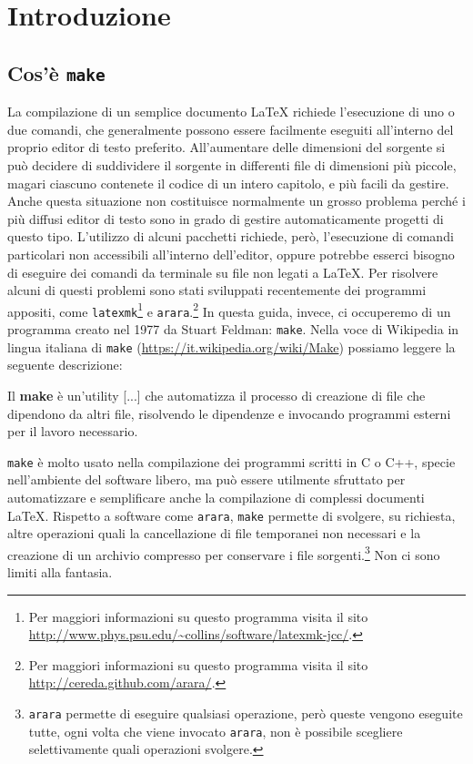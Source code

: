 \section{Introduzione}
\label{sec:introduzione}

\subsection{Cos'è \texttt{make}}
\label{sec:cose-make}

La compilazione di un semplice documento \LaTeX{}
richiede l'esecuzione di uno o due comandi, che generalmente possono essere
facilmente eseguiti all'interno del proprio editor di testo preferito.
All'aumentare delle dimensioni del sorgente si può decidere di suddividere il
sorgente in differenti file di dimensioni più piccole, magari ciascuno contenete
il codice di un intero capitolo, e più facili da gestire.  Anche questa
situazione non costituisce normalmente un grosso problema perché i più diffusi
editor di testo sono in grado di gestire automaticamente progetti di questo
tipo.  L'utilizzo di alcuni pacchetti richiede, però, l'esecuzione di comandi
particolari non accessibili all'interno dell'editor, oppure potrebbe esserci
bisogno di eseguire dei comandi da terminale su file non legati a \LaTeX{}.
Per risolvere alcuni di questi problemi sono stati sviluppati recentemente dei
programmi appositi, come
\texttt{latexmk}\footnote{Per maggiori informazioni su questo programma visita
  il sito \url{http://www.phys.psu.edu/~collins/software/latexmk-jcc/}.}
e
\texttt{arara}.\footnote{Per maggiori informazioni su questo programma visita il
  sito \url{http://cereda.github.com/arara/}.}
In questa guida, invece, ci occuperemo di un programma creato nel 1977 da Stuart
Feldman: \texttt{make}.  Nella voce di Wikipedia in lingua italiana di
\texttt{make} (\url{https://it.wikipedia.org/wiki/Make}) possiamo leggere la
seguente descrizione:
\begin{quoting}
  Il \textbf{make} è un'utility [...] che automatizza il processo di creazione
  di file che dipendono da altri file, risolvendo le dipendenze e invocando
  programmi esterni per il lavoro necessario.
\end{quoting}
\texttt{make} è molto usato nella compilazione dei programmi scritti in C o C++,
specie nell'ambiente del software libero, ma può essere utilmente sfruttato per
automatizzare e semplificare anche la compilazione di complessi documenti
\LaTeX{}.
Rispetto a software come \texttt{arara}, \texttt{make} permette di svolgere, su
richiesta, altre operazioni quali la cancellazione di file temporanei non
necessari e la creazione di un archivio compresso per conservare i file
sorgenti.\footnote{\texttt{arara} permette di eseguire qualsiasi operazione,
  però queste vengono eseguite tutte, ogni volta che viene invocato
  \texttt{arara}, non è possibile scegliere selettivamente quali operazioni
  svolgere.}  Non ci sono limiti alla fantasia.

